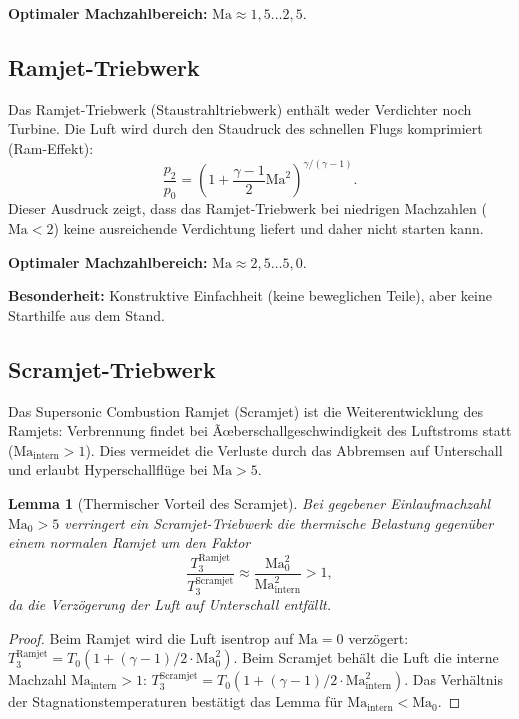 ﻿\documentclass[12pt,a4paper]{article}
\newtheorem{lemma}[theorem]{Lemma}
\theoremstyle{remark}
\newcommand{\Ma}{\mathrm{Ma}}
\begin{document}
\textbf{Optimaler Machzahlbereich:} $\Ma \approx 1{,}5 \ldots 2{,}5$.

\subsection{Ramjet-Triebwerk}

Das Ramjet-Triebwerk (Staustrahltriebwerk) enth\"alt weder Verdichter noch Turbine.
Die Luft wird durch den Staudruck des schnellen Flugs komprimiert (Ram-Effekt):
\begin{equation}
  \frac{p_2}{p_0} = \left(1 + \frac{\gamma-1}{2}\Ma^2\right)^{\gamma/(\gamma-1)}.
  \label{eq:ram_pressure}
\end{equation}
Dieser Ausdruck zeigt, dass das Ramjet-Triebwerk bei niedrigen Machzahlen
($\Ma < 2$) keine ausreichende Verdichtung liefert und daher nicht starten kann.

\textbf{Optimaler Machzahlbereich:} $\Ma \approx 2{,}5 \ldots 5{,}0$.

\textbf{Besonderheit:} Konstruktive Einfachheit (keine beweglichen Teile),
aber keine Starthilfe aus dem Stand.

\subsection{Scramjet-Triebwerk}

Das Supersonic Combustion Ramjet (Scramjet) ist die Weiterentwicklung des Ramjets:
Verbrennung findet bei Ãœberschallgeschwindigkeit des Luftstroms statt ($\Ma_{\mathrm{intern}} > 1$).
Dies vermeidet die Verluste durch das Abbremsen auf Unterschall
und erlaubt Hyperschallfl\"uge bei $\Ma > 5$.

\begin{lemma}[Thermischer Vorteil des Scramjet]
\label{lem:scramjet}
Bei gegebener Einlaufmachzahl $\Ma_0 > 5$ verringert ein Scramjet-Triebwerk
die thermische Belastung gegen\"uber einem normalen Ramjet um den Faktor
\[
  \frac{T_3^{\mathrm{Ramjet}}}{T_3^{\mathrm{Scramjet}}} \approx \frac{\Ma_0^2}{\Ma_{\mathrm{intern}}^2} > 1,
\]
da die Verz\"ogerung der Luft auf Unterschall entf\"allt.
\end{lemma}
\begin{proof}
Beim Ramjet wird die Luft isentrop auf $\Ma = 0$ verz\"ogert:
$T_3^{\mathrm{Ramjet}} = T_0 (1 + (\gamma-1)/2 \cdot \Ma_0^2)$.
Beim Scramjet beh\"alt die Luft die interne Machzahl $\Ma_{\mathrm{intern}} > 1$:
$T_3^{\mathrm{Scramjet}} = T_0 (1 + (\gamma-1)/2 \cdot \Ma_{\mathrm{intern}}^2)$.
Das Verh\"altnis der Stagnationstemperaturen best\"atigt das Lemma f\"ur $\Ma_{\mathrm{intern}} < \Ma_0$.
\end{proof}
\end{document}
